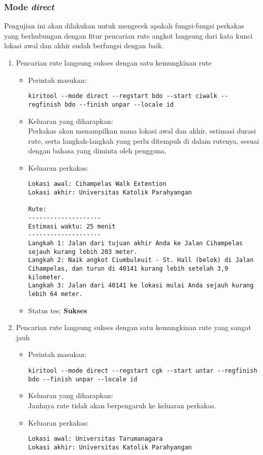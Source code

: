 \subsubsection{Mode \textit{direct}}
\label{sec:testing-experiments-testing-directroute}

Pengujian ini akan dilakukan untuk mengecek apakah fungsi-fungsi perkakas yang berhubungan dengan fitur pencarian rute angkot langsung dari kata kunci lokasi awal dan akhir sudah berfungsi dengan baik.

\begin{enumerate}
	\item Pencarian rute langsung sukses dengan satu kemungkinan rute
	\begin{itemize}
		\item Perintah masukan:
		\begin{lstlisting}
kiritool --mode direct --regstart bdo --start ciwalk --regfinish bdo --finish unpar --locale id
		\end{lstlisting}
		\item Keluaran yang diharapkan: \\
		Perkakas akan menampilkan nama lokasi awal dan akhir, estimasi durasi rute, serta langkah-langkah yang perlu ditempuh di dalam rutenya, sesuai dengan bahasa yang diminta oleh pengguna.
		\item Keluaran perkakas:
		\begin{lstlisting}
Lokasi awal: Cihampelas Walk Extention
Lokasi akhir: Universitas Katolik Parahyangan

Rute:
--------------------
Estimasi waktu: 25 menit 
--------------------
Langkah 1: Jalan dari tujuan akhir Anda ke Jalan Cihampelas sejauh kurang lebih 203 meter.
Langkah 2: Naik angkot Ciumbuleuit - St. Hall (belok) di Jalan Cihampelas, dan turun di 40141 kurang lebih setelah 3,9 kilometer.
Langkah 3: Jalan dari 40141 ke lokasi mulai Anda sejauh kurang lebih 64 meter.
		\end{lstlisting}
		\item Status tes: \textbf{Sukses}
	\end{itemize}
	
	\item Pencarian rute langsung sukses dengan satu kemungkinan rute yang sangat jauh
	\begin{itemize}
		\item Perintah masukan:
		\begin{lstlisting}
kiritool --mode direct --regstart cgk --start untar --regfinish bdo --finish unpar --locale id
		\end{lstlisting}
		\item Keluaran yang diharapkan: \\
		Jauhnya rute tidak akan berpengaruh ke keluaran perkakas.
		\item Keluaran perkakas:
		\begin{lstlisting}
Lokasi awal: Universitas Tarumanagara
Lokasi akhir: Universitas Katolik Parahyangan


\end{lstlisting}
\end{itemize}
\end{enumerate}
